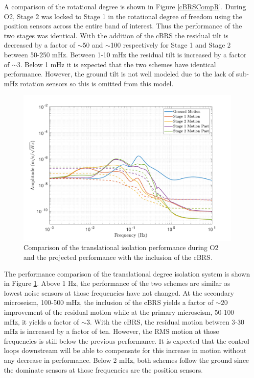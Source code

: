 \documentclass [12pt, proquest]{uwthesis}[2019]
\begin{document}
A comparison of the rotational degree is shown in Figure \ref{cBRSCompR}. During O2, Stage 2 was locked to Stage 1 in the rotational degree of freedom using the position sensors across the entire band of interest. Thus the performance of the two stages was identical. With the addition of the cBRS the residual tilt is decreased by a factor of $\sim$50 and $\sim$100 respectively for Stage 1 and Stage 2 between 50-250 mHz. Between 1-10 mHz the residual tilt is increased by a factor of $\sim$3. Below 1 mHz it is expected that the two schemes have identical performance. However, the ground tilt is not well modeled due to the lack of sub-mHz rotation sensors so this is omitted from this model.


\begin{figure}[!h]
\begin{center}
\includegraphics[width=\textwidth]{cBRS_Model_CompX.pdf}
\caption[Comparison of the translational isolation performance during O2 and the projected performance with the inclusion of the cBRS]{Comparison of the translational isolation performance during O2 and the projected performance with the inclusion of the cBRS.}
\label{cBRSCompX}
\end{center}
\end{figure}

The performance comparison of the translational degree isolation system is shown in Figure \ref{cBRSCompX}. Above 1 Hz, the performance of the two schemes are similar as lowest noise sensors at those frequencies have not changed. At the secondary microseism, 100-500 mHz, the inclusion of the cBRS yields a factor of $\sim$20 improvement of the residual motion while at the primary microseism, 50-100 mHz, it yields a factor of $\sim$3. With the cBRS, the residual motion between 3-30 mHz is increased by a factor of ten. However, the RMS motion at those frequencies is still below the previous performance. It is expected that the control loops downstream will be able to compensate for this increase in motion without any decrease in performance. Below 2 mHz, both schemes follow the ground since the dominate sensors at those frequencies are the position sensors.
\end{document}
